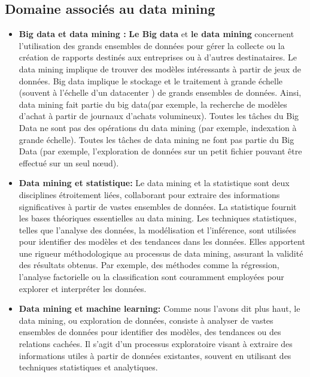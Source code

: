 \documentclass[a4paper,14pt]{article}
\begin{document}
    \subsection{Domaine associés au data mining} 
        \begin{itemize}
            \item \textbf{Big data et data mining :} 
                \textbf{Le Big data} et \textbf{le data mining} concernent l’utilisation des grands ensembles de données pour gérer la collecte ou la création de rapports destinés aux entreprises ou à d’autres destinataires. Le data mining implique de trouver des modèles intéressants à partir de jeux de données. Big data implique le stockage et le traitement à grande échelle (souvent à l’échelle d’un datacenter ) de grands ensembles de données. Ainsi, data mining fait partie du big data(par exemple, la recherche de modèles d’achat à partir de journaux d’achats volumineux). Toutes les tâches du Big Data ne sont pas des opérations du data mining (par exemple, indexation à grande échelle). Toutes les tâches de data mining ne font pas partie du Big Data (par exemple, l’exploration de données sur un petit fichier pouvant être effectué sur un seul nœud).
                
                
            \item \textbf{Data mining et statistique: } 
                ​Le data mining et la statistique sont deux disciplines étroitement liées, collaborant pour extraire des informations significatives à partir de vastes ensembles de données. 
                La statistique fournit les bases théoriques essentielles au data mining. Les techniques statistiques, telles que l'analyse des données, la modélisation et l'inférence, sont utilisées pour identifier des modèles et des tendances dans les données. Elles apportent une rigueur méthodologique au processus de data mining, assurant la validité des résultats obtenus. Par exemple, des méthodes comme la régression, l'analyse factorielle ou la classification sont couramment employées pour explorer et interpréter les données.
                
                
            \item \textbf{Data mining et machine learning: } 
                Comme nous l'avons dit plus haut, le data mining, ou exploration de données, consiste à analyser de vastes ensembles de données pour identifier des modèles, des tendances ou des relations cachées. Il s'agit d'un processus exploratoire visant à extraire des informations utiles à partir de données existantes, souvent en utilisant des techniques statistiques et analytiques.
                

\end{itemize}
\end{document}
